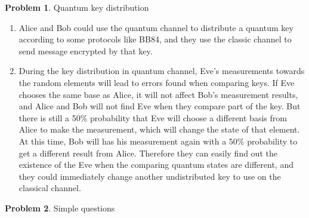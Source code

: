 \documentclass[12pt]{article}
\theoremstyle{definition}
\newtheorem{problem}{Problem}
\begin{document}
	\begin{problem}
		Quantum key distribution
	\end{problem}
	\begin{enumerate}
		\item
		Alice and Bob could use the quantum channel to distribute a quantum key according to some protocols like BB84, and they use the classic channel to send message encrypted by that key.
		\item
		During the key distribution in quantum channel, Eve's measurements towards the random elements will lead to errors found when comparing keys. If Eve chooses the same base as Alice, it will not affect Bob's measurement results, and Alice and Bob will not find Eve when they compare part of the key. But there is still a 50\% probability that Eve will choose a different basis from Alice to make the measurement, which will change the state of that element. At this time, Bob will has his measurement again with a 50\% probability to get a different result from Alice. Therefore they can easily find out the existence of the Eve when the comparing quantum states are different, and they could immediately change another undistributed key to use on the classical channel.
		
	\end{enumerate}
	\begin{problem}
		Simple questions
	\end{problem}
\end{document}
